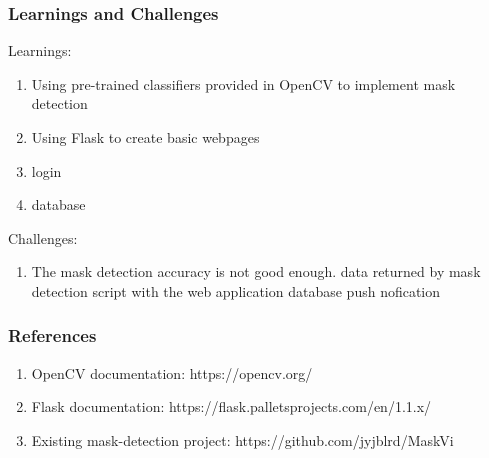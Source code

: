 \documentclass[14pt]{beamer}
\begin{document}
\begin{frame}
    \frametitle{Learnings and Challenges}
    Learnings:
    \begin{enumerate}
        \item Using pre-trained classifiers provided in OpenCV to implement mask detection
        \item Using Flask to create basic webpages
        \item login
        \item database
    \end{enumerate}
    Challenges:
    \begin{enumerate}
        \item The mask detection accuracy is not good enough.
        \integrating data returned by mask detection script with the web application database
        \web push nofication
    \end{enumerate}
\end{frame}

\begin{frame}
    \frametitle{References}
    \begin{enumerate}
        \item OpenCV documentation: https://opencv.org/
        \item Flask documentation: https://flask.palletsprojects.com/en/1.1.x/
        \item Existing mask-detection project: https://github.com/jyjblrd/MaskVi
    \end{enumerate}
\end{frame}
\end{document}
